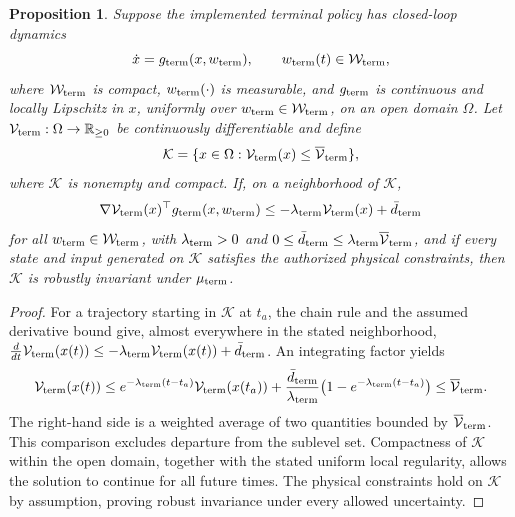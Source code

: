 \documentclass[final]{cas-sc}
\theoremstyle{definition}
\theoremstyle{plain}
\newtheorem{proposition}{Proposition}
\theoremstyle{definition}
\theoremstyle{plain}
\begin{document}
\begin{proposition}
\label{prop:backup-lyapunov}
Suppose the implemented terminal policy has closed-loop dynamics
\[
\dot x=g_{\rm term}(x,w_{\rm term}),\qquad w_{\rm term}(t)\in\mathcal W_{\rm term},
\]
where $\mathcal W_{\rm term}$ is compact, $w_{\rm term}(\cdot)$ is measurable, and $g_{\rm term}$ is
continuous and locally Lipschitz in $x$, uniformly over
$w_{\rm term}\in\mathcal W_{\rm term}$, on an open domain $\Omega$. Let
$\mathcal V_{\rm term}:\Omega\rightarrow\mathbb R_{\ge0}$ be continuously differentiable and define
\[
\mathcal K=\{x\in\Omega:\mathcal V_{\rm term}(x)\le \overline{\mathcal V}_{\rm term}\},
\]
where $\mathcal K$ is nonempty and compact. If, on a neighborhood of
$\mathcal K$,
\[
\nabla \mathcal V_{\rm term}(x)^\top g_{\rm term}(x,w_{\rm term})
\le -\lambda_{\rm term} \mathcal V_{\rm term}(x)+\bar d_{\rm term}
\]
for all $w_{\rm term}\in\mathcal W_{\rm term}$, with
$\lambda_{\rm term}>0$ and
$0\le\bar d_{\rm term}\le\lambda_{\rm term} \overline{\mathcal V}_{\rm term}$, and if every state and input generated
on $\mathcal K$ satisfies the authorized physical constraints, then
$\mathcal K$ is robustly invariant under $\mu_{\rm term}$.
\end{proposition}

\begin{proof}
For a trajectory starting in $\mathcal K$ at $t_a$, the chain rule
and the assumed derivative bound give, almost everywhere in the stated
neighborhood,
$\frac{d}{dt}\mathcal V_{\rm term}(x(t))\le-\lambda_{\rm term} \mathcal V_{\rm term}(x(t))+\bar d_{\rm term}$.
An integrating factor yields
\[
 \mathcal V_{\rm term}(x(t))\le e^{-\lambda_{\rm term}(t-t_a)}\mathcal V_{\rm term}(x(t_a))+
 \frac{\bar d_{\rm term}}{\lambda_{\rm term}}\bigl(1-e^{-\lambda_{\rm term}(t-t_a)}\bigr)
 \le \overline{\mathcal V}_{\rm term}.
\]
The right-hand side is a weighted average of two quantities bounded by
$\overline{\mathcal V}_{\rm term}$. This comparison excludes departure from the sublevel set.
Compactness of $\mathcal K$ within the open domain, together with the
stated uniform local regularity, allows the solution to continue for
all future times. The physical constraints hold on $\mathcal K$ by
assumption, proving robust invariance under every allowed uncertainty.
\end{proof}
\end{document}
